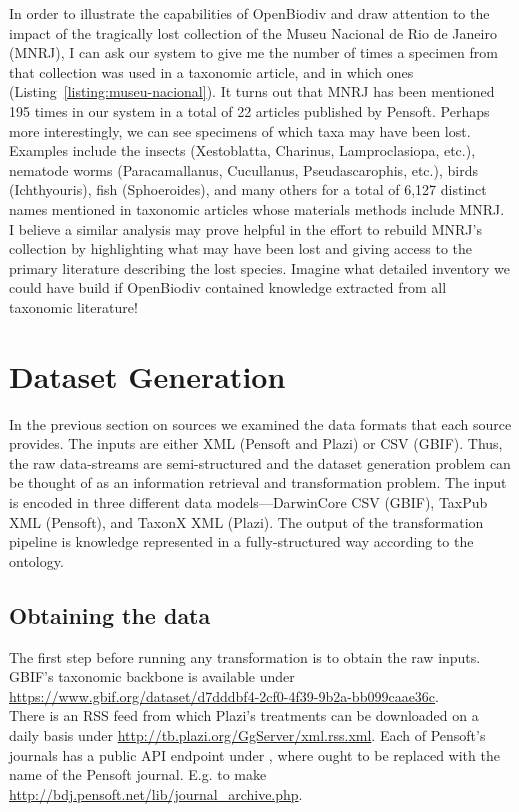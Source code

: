 In order to illustrate the capabilities of OpenBiodiv and draw attention to the impact of the tragically lost collection of the Museu Nacional de Rio de Janeiro (MNRJ), I can ask our system to give me the number of times a specimen from that collection was used in a taxonomic article, and in which ones (Listing~\ref{listing:museu-nacional}). It turns out that MNRJ has been mentioned 195 times in our system in a total of 22 articles published by Pensoft. Perhaps more interestingly, we can see specimens of which taxa may have been lost. Examples include the insects (Xestoblatta, Charinus, Lamproclasiopa, etc.), nematode worms (Paracamallanus, Cucullanus, Pseudascarophis, etc.), birds (Ichthyouris), fish (Sphoeroides), and many others for a total of 6,127 distinct names mentioned in taxonomic articles whose materials methods include MNRJ. I believe a similar analysis may prove helpful in the effort to rebuild MNRJ’s collection by highlighting what may have been lost and giving access to the primary literature describing the lost species. Imagine what detailed inventory we could have build if OpenBiodiv contained knowledge extracted from all taxonomic literature!





\section{Dataset Generation}

In the previous section on sources we examined the data formats that each source provides. The inputs are either XML (Pensoft and Plazi) or CSV (GBIF). Thus, the raw data-streams are semi-structured and the dataset generation problem can be thought of as an information retrieval and transformation problem. The input is encoded in three different data models---DarwinCore CSV (GBIF), TaxPub XML (Pensoft), and TaxonX XML (Plazi). The output of the transformation pipeline is  knowledge represented in a fully-structured way according to the ontology.

\subsection{Obtaining the data}

The first step before running any transformation is to obtain the raw inputs. GBIF's taxonomic backbone is available under\\ 
\url{https://www.gbif.org/dataset/d7dddbf4-2cf0-4f39-9b2a-bb099caae36c}.\\There is an RSS feed from which Plazi's treatments can be downloaded on a daily basis under \url{http://tb.plazi.org/GgServer/xml.rss.xml}. Each of Pensoft's journals has a public API endpoint under , where  ought to be replaced with the name of the Pensoft journal. E.g.  to make \url{http://bdj.pensoft.net/lib/journal_archive.php}.



